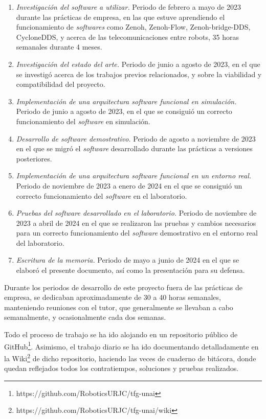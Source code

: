 \begin{enumerate}
    \item{\textit{Investigación del software a utilizar.} Periodo de febrero a
        mayo de 2023 durante las prácticas de empresa, en las que estuve
        aprendiendo el funcionamiento de \textit{softwares} como Zenoh,
        Zenoh-Flow, Zenoh-bridge-DDS, CycloneDDS, y acerca de las
        telecomunicaciones entre robots, 35 horas semanales durante 4 meses.}
    \item{\textit{Investigación del estado del arte.} Periodo de junio a agosto
        de 2023, en el que se investigó acerca de los trabajos previos
        relacionados, y sobre la viabilidad y compatibilidad del proyecto.}
    \item{\textit{Implementación de una arquitectura software funcional en
        simulación.} Periodo de junio a agosto de 2023, en el que se consiguió
        un correcto funcionamiento del \textit{software} en simulación.}
    \item{\textit{Desarrollo de software demostrativo.} Periodo de agosto a
        noviembre de 2023 en el que se migró el \textit{software} desarrollado
        durante las prácticas a versiones posteriores.}
    \item{\textit{Implementación de una arquitectura software funcional en un
        entorno real.} Periodo de noviembre de 2023 a enero de 2024 en el que se
        consiguió un correcto funcionamiento del \textit{software} en el
        laboratorio.}
    \item{\textit{Pruebas del software desarrollado en el laboratorio.} Periodo
        de noviembre de 2023 a abril de 2024 en el que se realizaron las pruebas
        y cambios necesarios para un correcto funcionamiento del
        \textit{software} demostrativo en el entorno real del laboratorio.}
    \item{\textit{Escritura de la memoria.} Periodo de mayo a junio de 2024 en el
        que se elaboró el presente documento, así como la presentación para su
        defensa.}
\end{enumerate}

Durante los periodos de desarrollo de este proyecto fuera de las prácticas de
empresa, se dedicaban aproximadamente de 30 a 40 horas semanales, manteniendo
reuniones con el tutor, que generalmente se llevaban a cabo semanalmente, y
ocasionalmente cada dos semanas.

Todo el proceso de trabajo se ha ido alojando en un repositorio público de
GitHub\footnote{https://github.com/RoboticsURJC/tfg-unai}.
Asimismo, el trabajo diario se ha ido documentando detalladamente en la
Wiki\footnote{https://github.com/RoboticsURJC/tfg-unai/wiki} de dicho
repositorio, haciendo las veces de cuaderno de bitácora, donde quedan reflejados
todos los contratiempos, soluciones y pruebas realizados.

